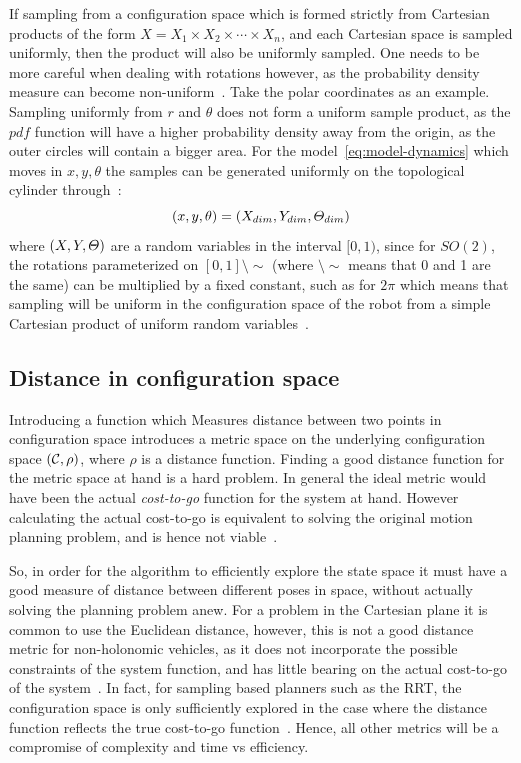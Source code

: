 If sampling from a configuration space which is formed strictly from Cartesian
products of the form \(X = X_1\times X_2\times \cdots \times X_n\), and each
Cartesian space is sampled uniformly, then the product will also be uniformly
sampled. One needs to be more careful when dealing with rotations however, as
the probability density measure can become non-uniform~\cite{Lav06}. Take the
polar coordinates as an example. Sampling uniformly from \(r\) and \(\theta\)
does not form a uniform sample product, as the \(pdf\) function will have a
higher probability density away from the origin, as the outer circles will
contain a bigger area. For the model~\cref{eq:model-dynamics} which moves in
\(x,y,\theta\) the samples can be generated uniformly on the topological
cylinder through~\cite{kuffnerEffectiveSamplingDistance2004}:
\[
  (x,y,\theta) = (\mathnormal{X}_{dim}, \mathnormal{Y}_{dim},
  \mathnormal{\Theta}_{dim})
\]
where \((\mathnormal{X}, \mathnormal{Y}, \mathnormal{\Theta})\) are a random
variables in the interval \([0,1)\), since for \(SO(2)\), the rotations
parameterized on \([0,1]\setminus\sim\) (where \(\setminus\sim\) means that 0
and 1 are the same) can be multiplied by a fixed constant, such as for \(2\pi\)
which means that sampling will be uniform in the configuration space of the
robot from a simple Cartesian product of uniform random variables~\cite{Lav06}.

\subsection{Distance in configuration space}

Introducing a function which Measures distance between two points in
configuration space introduces a metric space on the underlying configuration
space \((\mathcal{C}{},\rho)\), where \(\rho\) is a distance
function. Finding a good distance function for the metric space at hand is a
hard problem. In general the ideal metric would have been the actual
\textit{cost-to-go} function for the system at hand. However calculating the
actual cost-to-go is equivalent to solving the original motion planning problem,
and is hence not viable~\cite{pengchengReducingMetricSensitivity2001}.

So, in order for the \rrtfunnel{} algorithm to efficiently explore the state
space it must have a good measure of distance between different poses in space,
without actually solving the planning problem anew. For a problem in the
Cartesian plane it is common to use the Euclidean distance, however, this is not
a good distance metric for non-holonomic vehicles, as it does not incorporate
the possible constraints of the system function, and has little bearing on the
actual cost-to-go of the system~\cite{parkFeedbackMotionPlanning2015}. In fact,
for sampling based planners such as the \ac{RRT}, the configuration space is
only sufficiently explored in the case where the distance function reflects the
true cost-to-go function~\cite{pengchengReducingMetricSensitivity2001}. Hence,
all other metrics will be a compromise of complexity and time vs efficiency.

